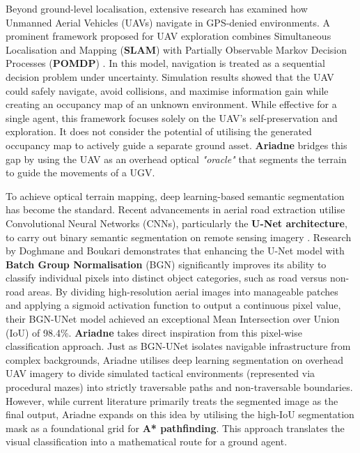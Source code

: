 \documentclass[12pt, a4paper]{article}
\begin{document}
\vspace{0.5cm}

Beyond ground-level localisation, extensive research has examined how Unmanned Aerial Vehicles (UAVs) navigate in GPS-denied environments. A prominent framework proposed for UAV exploration combines Simultaneous Localisation and Mapping (\textbf{SLAM}) with Partially Observable Markov Decision Processes (\textbf{POMDP}) \cite{8741612}. In this model, navigation is treated as a sequential decision problem under uncertainty. Simulation results showed that the UAV could safely navigate, avoid collisions, and maximise information gain while creating an occupancy map of an unknown environment. While effective for a single agent, this framework focuses solely on the UAV’s self-preservation and exploration. It does not consider the potential of utilising the generated occupancy map to actively guide a separate ground asset. \textbf{Ariadne} bridges this gap by using the UAV as an overhead optical \textit{"oracle"} that segments the terrain to guide the movements of a UGV.

\vspace{0.5cm}

To achieve optical terrain mapping, deep learning-based semantic segmentation has become the standard. Recent advancements in aerial road extraction utilise Convolutional Neural Networks (CNNs), particularly the \textbf{U-Net architecture}, to carry out binary semantic segmentation on remote sensing imagery \cite{Doghmane_Boukari_2024}. Research by Doghmane and Boukari demonstrates that enhancing the U-Net model with \textbf{Batch Group Normalisation} (BGN) significantly improves its ability to classify individual pixels into distinct object categories, such as road versus non-road areas. By dividing high-resolution aerial images into manageable patches and applying a sigmoid activation function to output a continuous pixel value, their BGN-UNet model achieved an exceptional Mean Intersection over Union (IoU) of 98.4\%. \textbf{Ariadne} takes direct inspiration from this pixel-wise classification approach. Just as BGN-UNet isolates navigable infrastructure from complex backgrounds, Ariadne utilises deep learning segmentation on overhead UAV imagery to divide simulated tactical environments (represented via procedural mazes) into strictly traversable paths and non-traversable boundaries. However, while current literature primarily treats the segmented image as the final output, Ariadne expands on this idea by utilising the high-IoU segmentation mask as a foundational grid for \textbf{A* pathfinding}. This approach translates the visual classification into a mathematical route for a ground agent.
\end{document}

